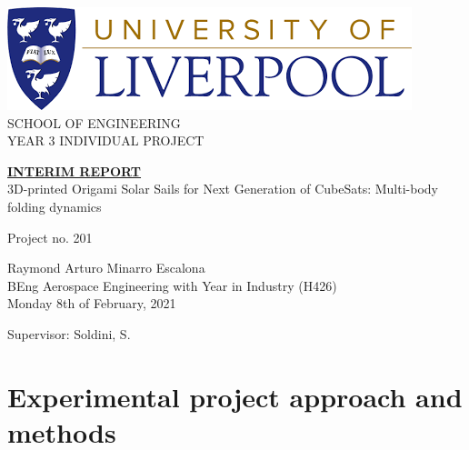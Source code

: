 \begin{titlepage}
   \begin{center}
       \large
        \includegraphics[scale=0.4]{logo}
       \\
       \vspace{0.5cm}
        SCHOOL OF ENGINEERING \\
        \vspace{0.5cm}
        YEAR 3 INDIVIDUAL PROJECT
        
        
            
       \vspace{1.5cm}

       \underline{\textbf{INTERIM REPORT}}\\
       \vspace{1.5cm}
       \Large{3D-printed Origami Solar Sails for Next Generation of CubeSats: Multi-body folding dynamics}
       \normalsize
       
      
       \vspace{1cm}
       Project no. 201
       \\
       

       \vfill
        
        \large
       Raymond Arturo Minarro Escalona
            \\
        BEng Aerospace Engineering with Year in Industry (H426)
        \\
        Monday 8th of February, 2021
       \vspace{0.8cm}
    
       \large{Supervisor: Soldini, S.}
       \normalsize
   \end{center}
\end{titlepage}



\pagebreak





\section{Experimental project approach and methods }

